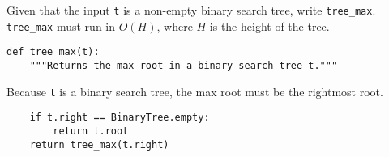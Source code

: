 \question
Given that the input \texttt{t} is a non-empty binary search tree, write
\texttt{tree\_max}. \texttt{tree\_max} must run in $O(H)$, where $H$ is the height of the tree.

\begin{lstlisting}
def tree_max(t):
    """Returns the max root in a binary search tree t."""
\end{lstlisting}
\begin{solution}[1.5in]
Because \texttt{t} is a binary search tree, the max root must be the rightmost
root.
\begin{lstlisting}
    if t.right == BinaryTree.empty:
        return t.root
    return tree_max(t.right)
\end{lstlisting}
\end{solution}
